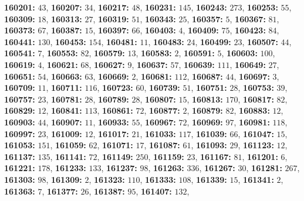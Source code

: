 \textsf{\bfseries 160201:} $43$, \textsf{\bfseries 160207:} $34$, \textsf{\bfseries 160217:} $48$, \textsf{\bfseries 160231:} $145$, \textsf{\bfseries 160243:} $273$, \textsf{\bfseries 160253:} $55$, \textsf{\bfseries 160309:} $18$, \textsf{\bfseries 160313:} $27$, \textsf{\bfseries 160319:} $51$, \textsf{\bfseries 160343:} $25$, \textsf{\bfseries 160357:} $5$, \textsf{\bfseries 160367:} $81$, \textsf{\bfseries 160373:} $67$, \textsf{\bfseries 160387:} $15$, \textsf{\bfseries 160397:} $66$, \textsf{\bfseries 160403:} $4$, \textsf{\bfseries 160409:} $75$, \textsf{\bfseries 160423:} $84$, \textsf{\bfseries 160441:} $130$, \textsf{\bfseries 160453:} $154$, \textsf{\bfseries 160481:} $11$, \textsf{\bfseries 160483:} $24$, \textsf{\bfseries 160499:} $23$, \textsf{\bfseries 160507:} $44$, \textsf{\bfseries 160541:} $7$, \textsf{\bfseries 160553:} $82$, \textsf{\bfseries 160579:} $13$, \textsf{\bfseries 160583:} $2$, \textsf{\bfseries 160591:} $5$, \textsf{\bfseries 160603:} $100$, \textsf{\bfseries 160619:} $4$, \textsf{\bfseries 160621:} $68$, \textsf{\bfseries 160627:} $9$, \textsf{\bfseries 160637:} $57$, \textsf{\bfseries 160639:} $111$, \textsf{\bfseries 160649:} $27$, \textsf{\bfseries 160651:} $54$, \textsf{\bfseries 160663:} $63$, \textsf{\bfseries 160669:} $2$, \textsf{\bfseries 160681:} $112$, \textsf{\bfseries 160687:} $44$, \textsf{\bfseries 160697:} $3$, \textsf{\bfseries 160709:} $11$, \textsf{\bfseries 160711:} $116$, \textsf{\bfseries 160723:} $60$, \textsf{\bfseries 160739:} $51$, \textsf{\bfseries 160751:} $28$, \textsf{\bfseries 160753:} $39$, \textsf{\bfseries 160757:} $23$, \textsf{\bfseries 160781:} $28$, \textsf{\bfseries 160789:} $28$, \textsf{\bfseries 160807:} $15$, \textsf{\bfseries 160813:} $170$, \textsf{\bfseries 160817:} $82$, \textsf{\bfseries 160829:} $12$, \textsf{\bfseries 160841:} $113$, \textsf{\bfseries 160861:} $72$, \textsf{\bfseries 160877:} $2$, \textsf{\bfseries 160879:} $82$, \textsf{\bfseries 160883:} $12$, \textsf{\bfseries 160903:} $44$, \textsf{\bfseries 160907:} $11$, \textsf{\bfseries 160933:} $55$, \textsf{\bfseries 160967:} $72$, \textsf{\bfseries 160969:} $97$, \textsf{\bfseries 160981:} $118$, \textsf{\bfseries 160997:} $23$, \textsf{\bfseries 161009:} $12$, \textsf{\bfseries 161017:} $21$, \textsf{\bfseries 161033:} $117$, \textsf{\bfseries 161039:} $66$, \textsf{\bfseries 161047:} $15$, \textsf{\bfseries 161053:} $151$, \textsf{\bfseries 161059:} $62$, \textsf{\bfseries 161071:} $17$, \textsf{\bfseries 161087:} $61$, \textsf{\bfseries 161093:} $29$, \textsf{\bfseries 161123:} $12$, \textsf{\bfseries 161137:} $135$, \textsf{\bfseries 161141:} $72$, \textsf{\bfseries 161149:} $250$, \textsf{\bfseries 161159:} $23$, \textsf{\bfseries 161167:} $81$, \textsf{\bfseries 161201:} $6$, \textsf{\bfseries 161221:} $178$, \textsf{\bfseries 161233:} $133$, \textsf{\bfseries 161237:} $98$, \textsf{\bfseries 161263:} $336$, \textsf{\bfseries 161267:} $30$, \textsf{\bfseries 161281:} $267$, \textsf{\bfseries 161303:} $98$, \textsf{\bfseries 161309:} $2$, \textsf{\bfseries 161323:} $110$, \textsf{\bfseries 161333:} $108$, \textsf{\bfseries 161339:} $15$, \textsf{\bfseries 161341:} $2$, \textsf{\bfseries 161363:} $7$, \textsf{\bfseries 161377:} $26$, \textsf{\bfseries 161387:} $95$, \textsf{\bfseries 161407:} $132$, 
